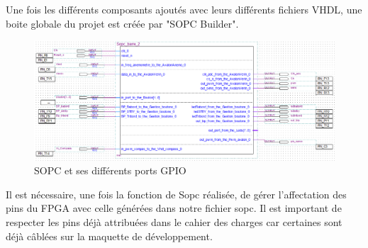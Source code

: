   Une fois les différents composants ajoutés avec leurs différents fichiers VHDL, une boite globale du projet est créée par "SOPC Builder".
\vspace{0.5cm}
  \begin{figure}[h]
    \begin{center}
      \includegraphics[width=\textwidth]{images/sopc_bloc.png}
      \caption{SOPC et ses différents ports GPIO}
    \end{center}
  \end{figure}

  Il est nécessaire, une fois la fonction de Sopc réalisée, de gérer l'affectation des pins du FPGA avec celle générées dans notre fichier sopc. Il est important de respecter les pins déjà attribuées dans le cahier des charges car certaines sont déjà câblées sur la maquette de développement.